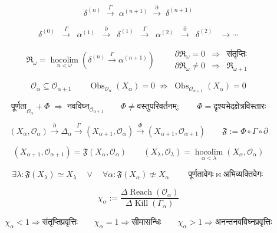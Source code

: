 \documentclass{article}
\begin{document}
\[
\boxed{
\delta^{(n)}
\;\xrightarrow{\Gamma}\;
\alpha^{(n+1)}
\;\xrightarrow{\partial}\;
\delta^{(n+1)}
}
\]

\[
\begin{array}{cccccccccc}
\delta^{(0)}
&\xrightarrow{\Gamma}&
\alpha^{(1)}
&\xrightarrow{\partial}&
\delta^{(1)}
&\xrightarrow{\Gamma}&
\alpha^{(2)}
&\xrightarrow{\partial}&
\delta^{(2)}
&\to\cdots
\end{array}
\]

\[
\boxed{
\mathfrak R_{\omega}
=
\operatorname*{hocolim}_{n<\omega}
\left(
\delta^{(n)}
\xrightarrow{\Gamma}
\alpha^{(n+1)}
\right)
}
\qquad
\boxed{
\begin{array}{ccc}
\partial\mathfrak R_{\omega}=0
&\Longrightarrow&
\text{संतृप्तिः}
\\[1mm]
\partial\mathfrak R_{\omega}\neq0
&\Longrightarrow&
\mathfrak R_{\omega+1}
\end{array}
}
\]

\[
\mathcal O_\alpha
\subseteq
\mathcal O_{\alpha+1}
\qquad
\operatorname{Obs}_{\mathcal O_\alpha}(X_\alpha)=0
\;\not\Longrightarrow\;
\operatorname{Obs}_{\mathcal O_{\alpha+1}}(X_\alpha)=0
\]

\[
\boxed{
\text{पूर्णता}_{\mathcal O_\alpha}
+
\Phi
\;\Longrightarrow\;
\text{नवविघ्न}_{\mathcal O_{\alpha+1}}
}
\qquad
\boxed{
\Phi
\neq
\text{वस्तुपरिवर्तनम्};
\qquad
\Phi
=
\text{दृश्यभेदक्षेत्रविस्तारः}
}
\]

\[
(X_\alpha,\mathcal O_\alpha)
\xrightarrow{\partial}
\Delta_\alpha
\xrightarrow{\Gamma}
(X_{\alpha+1},\mathcal O_\alpha)
\xrightarrow{\Phi}
(X_{\alpha+1},\mathcal O_{\alpha+1})
\qquad
\boxed{
\mathfrak F
:=
\Phi\circ\Gamma\circ\partial
}
\]

\[
(X_{\alpha+1},\mathcal O_{\alpha+1})
=
\mathfrak F(X_\alpha,\mathcal O_\alpha)
\qquad
(X_\lambda,\mathcal O_\lambda)
=
\operatorname*{hocolim}_{\alpha<\lambda}
(X_\alpha,\mathcal O_\alpha)
\]

\[
\boxed{
\exists\lambda:
\mathfrak F(X_\lambda)
\simeq
X_\lambda
\quad\vee\quad
\forall\alpha:
\mathfrak F(X_\alpha)
\not\simeq
X_\alpha
}
\qquad
\boxed{
\text{पूर्णतावेगः}
\;\bowtie\;
\text{अभिव्यक्तिवेगः}
}
\]

\[
\chi_\alpha
:=
\frac{
\Delta\operatorname{Reach}(\mathcal O_\alpha)
}{
\Delta\operatorname{Kill}(\Gamma_\alpha)
}
\]

\[
\chi_\alpha<1
\Longrightarrow
\text{संतृप्तिप्रवृत्तिः}
\qquad
\chi_\alpha=1
\Longrightarrow
\text{सीमासन्धिः}
\qquad
\chi_\alpha>1
\Longrightarrow
\text{अनन्तनवविघ्नप्रवृत्तिः}
\]
\end{document}
